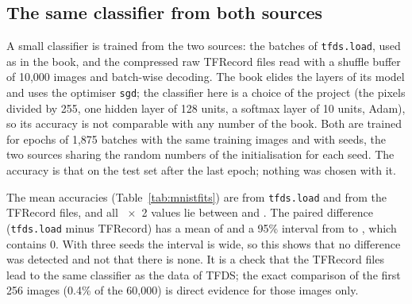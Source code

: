 \subsection{The same classifier from both sources}

A small classifier is trained from the two sources: the batches of \texttt{tfds.load}, used as in the book, and the compressed raw TFRecord files read with a shuffle buffer of 10,000 images and batch-wise decoding. The book elides the layers of its model and uses the optimiser \texttt{sgd}; the classifier here is a choice of the project (the pixels divided by 255, one hidden layer of 128 units, a softmax layer of 10 units, Adam), so its accuracy is not comparable with any number of the book. Both are trained for  epochs of 1,875 batches with the same  training images and with  seeds, the two sources sharing the random numbers of the initialisation for each seed. The accuracy is that on the test set after the last epoch; nothing was chosen with it.

\begin{table}[!htbp]
\centering
\small

\caption{Test accuracy of the same classifier trained from the two sources: mean and standard deviation over the seeds.}
\label{tab:mnistfits}
\end{table}

The mean accuracies (Table~\ref{tab:mnistfits}) are  from \texttt{tfds.load} and  from the TFRecord files, and all ~$\times$~2 values lie between  and . The paired difference (\texttt{tfds.load} minus TFRecord) has a mean of  and a 95\% interval from  to , which contains 0. With three seeds the interval is wide, so this shows that no difference was detected and not that there is none. It is a check that the TFRecord files lead to the same classifier as the data of TFDS; the exact comparison of the first 256 images (0.4\% of the 60,000) is direct evidence for those images only.
